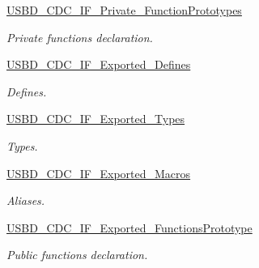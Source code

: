 \begin{DoxyCompactItemize}
\hyperlink{group__USBD__CDC__IF__Private__FunctionPrototypes}{U\+S\+B\+D\+\_\+\+C\+D\+C\+\_\+\+I\+F\+\_\+\+Private\+\_\+\+Function\+Prototypes}
\begin{DoxyCompactList}\small\item\em Private functions declaration. \end{DoxyCompactList}\item 
\hyperlink{group__USBD__CDC__IF__Exported__Defines}{U\+S\+B\+D\+\_\+\+C\+D\+C\+\_\+\+I\+F\+\_\+\+Exported\+\_\+\+Defines}
\begin{DoxyCompactList}\small\item\em Defines. \end{DoxyCompactList}\item 
\hyperlink{group__USBD__CDC__IF__Exported__Types}{U\+S\+B\+D\+\_\+\+C\+D\+C\+\_\+\+I\+F\+\_\+\+Exported\+\_\+\+Types}
\begin{DoxyCompactList}\small\item\em Types. \end{DoxyCompactList}\item 
\hyperlink{group__USBD__CDC__IF__Exported__Macros}{U\+S\+B\+D\+\_\+\+C\+D\+C\+\_\+\+I\+F\+\_\+\+Exported\+\_\+\+Macros}
\begin{DoxyCompactList}\small\item\em Aliases. \end{DoxyCompactList}\item 
\hyperlink{group__USBD__CDC__IF__Exported__FunctionsPrototype}{U\+S\+B\+D\+\_\+\+C\+D\+C\+\_\+\+I\+F\+\_\+\+Exported\+\_\+\+Functions\+Prototype}
\begin{DoxyCompactList}\small\item\em Public functions declaration. \end{DoxyCompactList}\end{DoxyCompactItemize}
